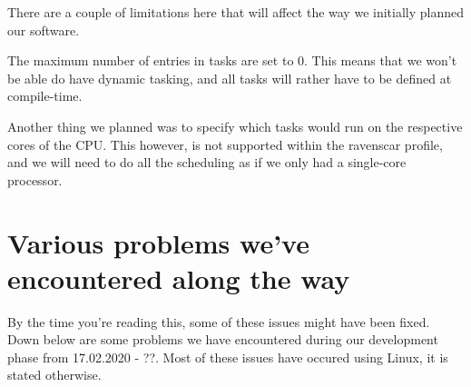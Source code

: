 \documentclass{article}
\begin{document}
There are a couple of limitations here that will affect the way we initially planned our software. 

The maximum number of entries in tasks are set to 0. This means that we won't be able do have dynamic tasking, and all tasks will rather have to be defined at compile-time. 

Another thing we planned was to specify which tasks would run on the respective cores of the CPU. This however, is not supported within the ravenscar profile, and we will need to do all the scheduling as if we only had a single-core processor. 

\section{Various problems we've encountered along the way}

By the time you're reading this, some of these issues might have been fixed. Down below are some problems we have encountered during our development phase from 17.02.2020 - ??. Most of these issues have occured using Linux, it is stated otherwise.
\end{document}
